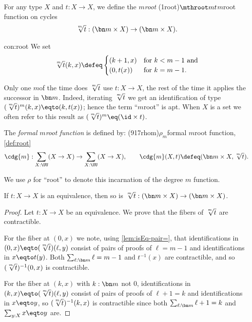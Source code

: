 \begin{construction}\label{con:root}
  For any type $X$ and $t:X\to X$, we define the $m$\th \emph{root}%
  \glossary(1root){$\protect\mthroot mt$}{$m$\th root function on cycles}
 \[
    {\textstyle\sqrt[\uproot{2}m]t} : (\bn m\times X) \to (\bn m\times X).
  \]
\end{construction}
\begin{implementation}{con:root}
  We set
  \[
    {\textstyle\sqrt[\uproot{2}m]t}(k,x)\defeq
    \begin{cases}
      (k+1,x)& \text{for $k<m-1$ and}\\
      (0,t(x))& \text{for $k=m-1$}.
    \end{cases}
  \]
\par \vspace{-1.5\baselineskip}
\qedhere
\end{implementation}
Only one $m$\th of the time does $\sqrt[\uproot{2}m]t$ use $t:X\to X$,
the rest of the time it applies the successor in $\bn m$.
Indeed, iterating $\sqrt[\uproot{2}m]t$
we get an identification of type $(\sqrt[\uproot{2}m]t)^m(k,x)\eqto(k,t(x))$;
hence the term ``$m$\th root'' is apt. When $X$ is a set we often refer to 
this result as $(\sqrt[\uproot{2}m]t)^m\eq(\id\times t)$.

\begin{definition}\label{def:root}
  The \emph{formal $m$\th root function} is defined by:
  \glossary(917rhom){$\rho_m$}{formal $m$\th root function, \cref{def:root}}
  \[
    \cdg{m}:\sum_{X:\UU}(X\to X)\to\sum_{X:\UU}(X\to X),\qquad
    \cdg{m}(X,t)\defeq(\bn m\times X,{\textstyle\sqrt[\uproot{2}m]t}).\qedhere
  \]
\end{definition}
\noindent We use $\rho$ for ``root'' to denote this incarnation
of the degree $m$ function.

\begin{lemma}\label{lem:root-pres-equiv}
  If $t:X\to X$ is an equivalence,
  then so is $\sqrt[\uproot{2}m]t : (\bn m\times X) \to (\bn m\times X)$.
\end{lemma}
\begin{proof}
  Let $t:X\to X$ be an equivalence. We prove that the fibers of
  $\sqrt[\uproot{2}m]t$ are contractible.

  For the fiber at $(0,x)$ we note,
  using \cref{lem:isEq-pair=}, that identifications in
  $(0,x)\eqto(\sqrt[\uproot{2}m]t)(\ell,y)$ consist of pairs of proofs
  of  $\ell=m-1$ and identifications in $x\eqto t(y)$.
  Both $\sum_{\ell:\bn m}\ell=m-1$ and $t^{-1}(x)$ are contractible,
  and so $(\sqrt[\uproot{2}m]t)^{-1}(0,x)$ is contractible.

  For the fiber at $(k,x)$ with $k:\bn m$ not $0$,
  identifications in $(k,x)\eqto(\sqrt[\uproot{2}m]t)(\ell,y)$
  consist of pairs of proofs of $\ell+1=k$ and identifications in $x\eqto y$,
  so $(\sqrt[\uproot{2}m]t)^{-1}(k,x)$ is contractible since both
  $\sum_{\ell:\bn m}\ell+1=k$ and $\sum_{y:X}x\eqto y$ are.
\end{proof}

